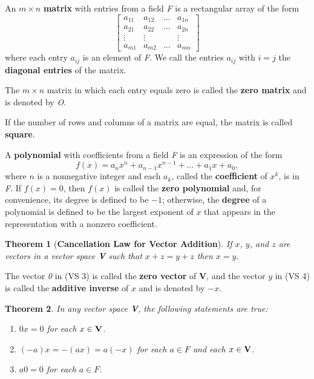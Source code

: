 \documentclass{article}
\newtheorem{theorem}{Theorem}
\begin{document}
An $m \times n$ \textbf{matrix} with entries from a field \textit{F} is a rectangular array of the form
\[\begin{bmatrix}
	a_{11} & a_{12} & \hdots & a_{1n} \\
	a_{21} & a_{22} & \hdots & a_{2n} \\
	\vdots & \vdots & & \vdots \\
	a_{m1} & a_{m2} & \hdots & a_{mn}
\end{bmatrix}\]
where each entry $a_{ij}$ is an element of \textit{F}. We call the entries $a_{ij}$ with $i = j$ the \textbf{diagonal entries} of the matrix.

The $m \times n$ matrix in which each entry equals zero is called the \textbf{zero matrix} and is denoted by \textit{O}.

If the number of rows and columns of a matrix are equal, the matrix is called \textbf{square}.

A \textbf{polynomial} with coefficients from a field \textit{F} is an expression of the form \[f(x) = a_nx^n + a_{n-1}x^{n-1} + \hdots + a_1x + a_0,\] where $n$ is a nonnegative integer and each $a_k$, called the \textbf{coefficient} of $x^k$, is in \textit{F}. If $f(x) = 0$, then $f(x)$ is called the \textbf{zero polynomial} and, for convenience, its degree is defined to be $-1$; otherwise, the \textbf{degree} of a polynomial is defined to be the largest exponent of $x$ that appears in the representation with a nonzero coefficient.

\begin{theorem}[\textbf{Cancellation Law for Vector Addition}]
	If $x$, $y$, and $z$ are vectors in a vector space \textbf{\textup{V}} such that $x + z = y + z$ then $x = y$.
\end{theorem}

The vector \textit{0} in (VS 3) is called the \textbf{zero vector} of \textbf{V}, and the vector $y$ in (VS 4) is called the \textbf{additive inverse} of $x$ and is denoted by $-x$.

\begin{theorem}
	In any vector space \textbf{\textup{V}}, the following statements are true:
	\begin{enumerate}
		\item[(a)] $0x = 0$ for each $x\in\textbf{\textup{V}}$.
		\item[(b)] $(-a)x = -(ax) = a(-x)$ for each $a\in F$ and each $x\in\textbf{\textup{V}}$.
		\item[(c)] $a\textit{0} = \textit{0}$ for each $a\in F$.
	\end{enumerate}
\end{theorem}
\end{document}
